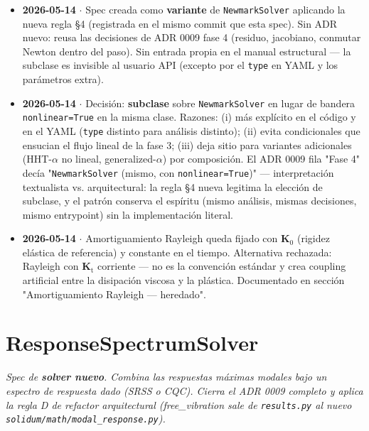 \documentclass[11pt,letterpaper,oneside]{report}
\begin{document}
\begin{itemize}
  \item \textbf{2026-05-14} \ensuremath{\cdot} Spec creada como \textbf{variante} de \texttt{NewmarkSolver} aplicando la nueva regla §4 (registrada en el mismo commit que esta spec). Sin ADR nuevo: reusa las decisiones de ADR 0009 fase 4 (residuo, jacobiano, conmutar Newton dentro del paso). Sin entrada propia en el manual estructural --- la subclase es invisible al usuario API (excepto por el \texttt{type} en YAML y los parámetros extra).
  \item \textbf{2026-05-14} \ensuremath{\cdot} Decisión: \textbf{subclase} sobre \texttt{NewmarkSolver} en lugar de bandera \texttt{nonlinear=True} en la misma clase. Razones: (i) más explícito en el código y en el YAML (\texttt{type} distinto para análisis distinto); (ii) evita condicionales que ensucian el flujo lineal de la fase 3; (iii) deja sitio para variantes adicionales (HHT-\ensuremath{\alpha} no lineal, generalized-\ensuremath{\alpha}) por composición. El ADR 0009 fila "Fase 4" decía "\texttt{NewmarkSolver} (mismo, con \texttt{nonlinear=True})" --- interpretación textualista vs. arquitectural: la regla §4 nueva legitima la elección de subclase, y el patrón conserva el espíritu (mismo análisis, mismas decisiones, mismo entrypoint) sin la implementación literal.
  \item \textbf{2026-05-14} \ensuremath{\cdot} Amortiguamiento Rayleigh queda fijado con $\mathbf K_0$ (rigidez elástica de referencia) y constante en el tiempo. Alternativa rechazada: Rayleigh con $\mathbf K_\text{t}$ corriente --- no es la convención estándar y crea coupling artificial entre la disipación viscosa y la plástica. Documentado en sección "Amortiguamiento Rayleigh --- heredado".
\end{itemize}


\newpage

\section{ResponseSpectrumSolver}



\textit{Spec de \textbf{solver nuevo}. Combina las respuestas máximas modales bajo un espectro de respuesta dado (SRSS o CQC). Cierra el ADR 0009 completo y aplica la regla D de refactor arquitectural (free\_vibration sale de \texttt{results.py} al nuevo \texttt{solidum/math/modal\_response.py}).}
\end{document}
